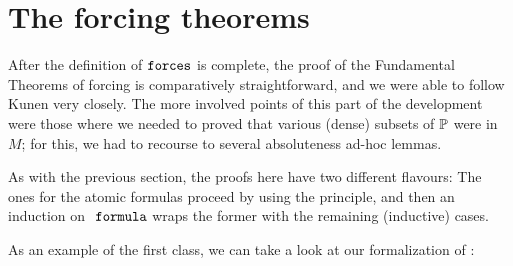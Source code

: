 \section{The forcing theorems}

After the definition of $\mathop{\mathtt{forces}}$ is complete, the proof of the
Fundamental Theorems of forcing is comparatively straightforward, and
we were able to follow Kunen very closely. The more involved points of
this part of the development were those where we needed to proved that
various (dense) subsets of $\mathbb{P}$ were in $M$; for this, we had to
recourse to several absoluteness ad-hoc lemmas.

As with the previous section, the proofs here have two different
flavours: The ones for the atomic formulas proceed by using the
 principle, and then an induction on
$\formula$ wraps the former with the remaining (inductive) cases. 

As an example of the first class, we can take a look at our
formalization of \cite[Lem.~IV.2.40(a)]{kunen2011set}:

